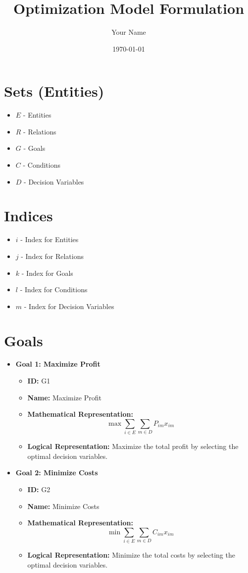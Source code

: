 \documentclass{article}
\title{Optimization Model Formulation}
\author{Your Name}
\date{\today}
\begin{document}
\maketitle
\tableofcontents

\section{Sets (Entities)}
\begin{itemize}
    \item $E$ - Entities
    \item $R$ - Relations
    \item $G$ - Goals
    \item $C$ - Conditions
    \item $D$ - Decision Variables
\end{itemize}

\section{Indices}
\begin{itemize}
    \item $i$ - Index for Entities
    \item $j$ - Index for Relations
    \item $k$ - Index for Goals
    \item $l$ - Index for Conditions
    \item $m$ - Index for Decision Variables
\end{itemize}

\section{Goals}
\begin{itemize}
    \item \textbf{Goal 1: Maximize Profit}
    \begin{itemize}
        \item \textbf{ID:} G1
        \item \textbf{Name:} Maximize Profit
        \item \textbf{Mathematical Representation:}
        \[
        \max \sum_{i \in E} \sum_{m \in D} P_{im} x_{im}
        \]
        \item \textbf{Logical Representation:} Maximize the total profit by selecting the optimal decision variables.
    \end{itemize}
    \item \textbf{Goal 2: Minimize Costs}
    \begin{itemize}
        \item \textbf{ID:} G2
        \item \textbf{Name:} Minimize Costs
        \item \textbf{Mathematical Representation:}
        \[
        \min \sum_{i \in E} \sum_{m \in D} C_{im} x_{im}
        \]
        \item \textbf{Logical Representation:} Minimize the total costs by selecting the optimal decision variables.
    \end{itemize}
\end{itemize}
\end{document}
